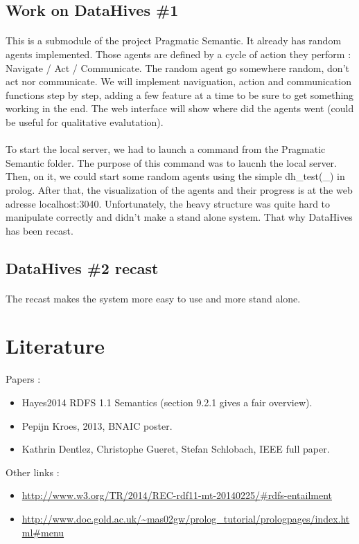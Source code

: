 \documentclass{article}
\newenvironment{itemh}[0]{\begin{itemize}[label=$\heartsuit$, font=\color{gray} \small]}{\end{itemize}}
\begin{document}
	\subsection{Work on DataHives \#1}
		\paragraph{} This is a submodule of the project Pragmatic Semantic.
		It already has random agents implemented.
		Those agents are defined by a cycle of action they perform : Navigate / Act / Communicate.
		The random agent go somewhere random, don't act nor communicate.
		We will implement naviguation, action and communication functions step by step,
		adding a few feature at a time to be sure to get something working in the end.
		The web interface will show where did the agents went (could be useful for qualitative evalutation).
		\paragraph{} To start the local server, we had to launch a command from the Pragmatic Semantic folder.
		The purpose of this command was to laucnh the local server.
		Then, on it, we could start some random agents using the simple dh\_test(\_) in prolog.
		After that, the visualization of the agents and their progress is at the web adresse localhost:3040.
		Unfortunately, the heavy structure was quite hard to manipulate correctly and didn't make a stand alone system.
		That why DataHives has been recast.
	\subsection{DataHives \#2 recast}
		\paragraph{} The recast makes the system more easy to use and more stand alone.

\newpage

\section{Literature}
	Papers :
	\begin{itemh}
		\item Hayes2014 RDFS 1.1 Semantics (section 9.2.1 gives a fair overview).
		\item Pepijn Kroes, 2013, BNAIC poster.
		\item Kathrin Dentlez, Christophe Gueret, Stefan Schlobach, IEEE full paper.
	\end{itemh}
	Other links :
	\begin{itemh}
		\item\url{http://www.w3.org/TR/2014/REC-rdf11-mt-20140225/#rdfs-entailment}
		\item \url{http://www.doc.gold.ac.uk/~mas02gw/prolog_tutorial/prologpages/index.html#menu}
	\end{itemh}
\end{document}
